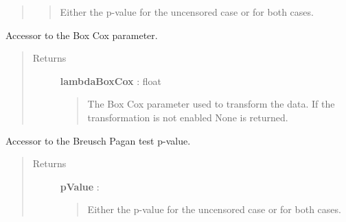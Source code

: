 \documentclass[letterpaper,10pt,english]{sphinxmanual}
\begin{document}
\begin{fulllineitems}
\begin{fulllineitems}
\begin{quote}
\begin{description}
\begin{quote}
Either the p-value for the uncensored case or for both cases.
\end{quote}

\end{description}\end{quote}

\end{fulllineitems}


\begin{fulllineitems}
\label{_generated/otpod.UnivariateLinearModelAnalysis:otpod.UnivariateLinearModelAnalysis.getBoxCoxParameter}
Accessor to the Box Cox parameter.
\begin{quote}\begin{description}
\item[{Returns}] \leavevmode
\textbf{lambdaBoxCox} : float
\begin{quote}

The Box Cox parameter used to transform the data. If the transformation
is not enabled None is returned.
\end{quote}

\end{description}\end{quote}

\end{fulllineitems}


\begin{fulllineitems}
\label{_generated/otpod.UnivariateLinearModelAnalysis:otpod.UnivariateLinearModelAnalysis.getBreuschPaganPValue}
Accessor to the Breusch Pagan test p-value.
\begin{quote}\begin{description}
\item[{Returns}] \leavevmode
\textbf{pValue} : \href{http://doc.openturns.org/openturns-latest/sphinx/user\_manual/\_generated/openturns.NumericalPoint.html\#openturns.NumericalPoint}{}
\begin{quote}

Either the p-value for the uncensored case or for both cases.
\end{quote}

\end{description}\end{quote}


\end{fulllineitems}
\end{fulllineitems}
\end{document}
